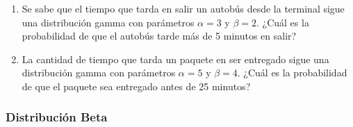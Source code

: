 \begin{Ejer}
\begin{enumerate}
    \item Se sabe que el tiempo que tarda en salir un autobús desde la terminal sigue una distribución gamma con parámetros $\alpha=3$ y $\beta=2$. ¿Cuál es la probabilidad de que el autobús tarde más de 5 minutos en salir?

    \item La cantidad de tiempo que tarda un paquete en ser entregado sigue una distribución gamma con parámetros $\alpha=5$ y $\beta=4$. ¿Cuál es la probabilidad de que el paquete sea entregado antes de 25 minutos?

\end{enumerate}

\end{Ejer}


\subsubsection{Distribución Beta}
